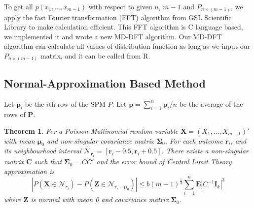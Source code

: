 \documentclass[12pt]{article}
\newcommand{\EE}{\mathbf{E}}
\newcommand{\pvec}{\boldsymbol{p}}
\newtheorem{thm}{Theorem}
\begin{document}
To get all $p(x_1,\dots,x_{m-1})$ with respect to given $n$, $m-1$ and $P_{n \times (m-1)}$, we apply the fast Fourier transformation (FFT) algorithm  from GSL Scientific Library to make calculation efficient. This FFT algorithm is C language based, we implemented it and wrote a new MD-DFT algorithm. Our MD-DFT algorithm can calculate all values of distribution function as long as we input our $P_{n\times (m-1)}$ matrix, and it can be called from R.



\subsection{Normal-Approximation Based Method}
Let $\pvec_i$ be the $i$th row of the SPM $P$. Let $\pvec=\sum_{i=1}^n\pvec_i/n$ be the average of the rows of $\boldsymbol{P}$.


\begin{thm}
For a Poisson-Multinomial random variable $\boldsymbol{X} = (X_1,\dots,X_{m-1})'$ with mean $\boldsymbol{\mu}_0$ and non-singular covariance matrix $\boldsymbol{\Sigma}_0$. For each outcome $\boldsymbol{r}_i$, and its neighbourhood interval $\mathcal{N}_{\boldsymbol{r}_i} = [\boldsymbol{r}_i-0.5,\boldsymbol{r}_i+0.5]$. There exists a non-singular matrix $\boldsymbol{C}$ such that $\boldsymbol{\Sigma}_0 = CC'$ and the error bound of Central Limit Theory approximation is
\begin{equation*}
    |P(\boldsymbol{X} \in \mathcal{N}_{r_i}) - P(\boldsymbol{Z} \in \mathcal{N}_{r_i-\boldsymbol{\mu}_0})| \leq b (m-1)^{\frac{1}{4}} \sum_{i=1}^{n}\EE|C^{-1}\boldsymbol{I}_{k}|^3
\end{equation*}
where $\boldsymbol{Z}$ is normal with mean 0 and covariance matrix $\boldsymbol{\Sigma}_0$.
\end{thm}
\end{document}
